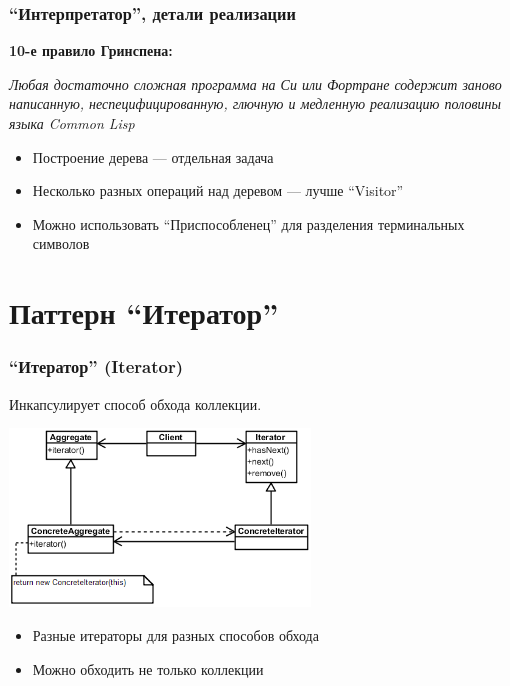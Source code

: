 \documentclass{../../slides-style}
\begin{document}
    \begin{frame}
        \frametitle{``Интерпретатор'', детали реализации}
        \begin{footnotesize}
            \textbf{10-е правило Гринспена:}
            
            \textit{Любая достаточно сложная программа на Си или Фортране содержит заново написанную, неспецифицированную, глючную и медленную реализацию половины языка Common Lisp}
        \end{footnotesize}
        \begin{itemize}
            \item Построение дерева --- отдельная задача
            \item Несколько разных операций над деревом --- лучше ``Visitor''
            \item Можно использовать ``Приспособленец'' для разделения терминальных символов
        \end{itemize}
    \end{frame}

    \section{Паттерн ``Итератор''}

    \begin{frame}
        \frametitle{``Итератор'' (Iterator)}
        Инкапсулирует способ обхода коллекции.
        \begin{center}
            \includegraphics[width=0.6\textwidth]{iterator.png}
        \end{center}
        \begin{itemize}
            \item Разные итераторы для разных способов обхода
            \item Можно обходить не только коллекции
        \end{itemize}
    \end{frame}
\end{document}
